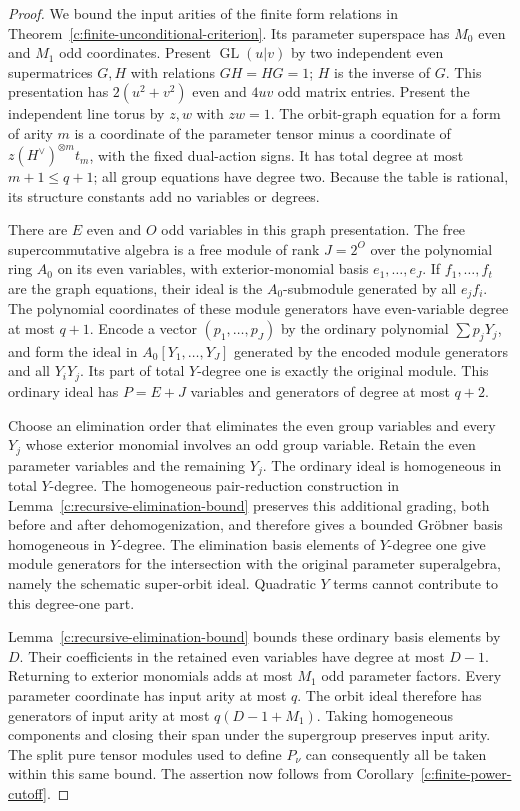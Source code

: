 \begin{proof}
We bound the input arities of the finite form relations in
Theorem~\ref{c:finite-unconditional-criterion}.  Its parameter
superspace has $M_0$ even and $M_1$ odd coordinates.
Present $\operatorname{GL}(u|v)$ by two independent even
supermatrices $G,H$ with relations $GH=HG=1$; $H$ is the inverse
of $G$.  This presentation has $2(u^2+v^2)$ even and $4uv$ odd
matrix entries.  Present the independent line torus by $z,w$
with $zw=1$.  The orbit-graph equation for a form of arity $m$
is a coordinate of the parameter tensor minus a coordinate of
$z(H^\vee)^{\otimes m}t_m$, with the fixed dual-action signs.
It has total degree at most $m+1\leq q+1$; all group equations
have degree two.  Because the table is rational, its structure
constants add no variables or degrees.

There are $E$ even and $O$ odd variables in this graph
presentation.  The free supercommutative algebra is a free module
of rank $J=2^O$ over the polynomial ring $A_0$ on its even
variables, with exterior-monomial basis $e_1,\ldots,e_J$.
If $f_1,\ldots,f_t$ are the graph equations, their ideal is the
$A_0$-submodule generated by all $e_j f_i$.  The polynomial
coordinates of these module generators have even-variable
degree at most $q+1$.  Encode a vector $(p_1,\ldots,p_J)$ by
the ordinary polynomial $\sum p_jY_j$, and form the ideal in
$A_0[Y_1,\ldots,Y_J]$ generated by the encoded module generators
and all $Y_iY_j$.  Its part of total $Y$-degree one is exactly
the original module.  This ordinary ideal has $P=E+J$ variables
and generators of degree at most $q+2$.

Choose an elimination order that eliminates the even group
variables and every $Y_j$ whose exterior monomial involves an
odd group variable.  Retain the even parameter variables and
the remaining $Y_j$.  The ordinary ideal is homogeneous in
total $Y$-degree.  The homogeneous pair-reduction construction in
Lemma~\ref{c:recursive-elimination-bound} preserves this additional
grading, both before and after dehomogenization, and therefore
gives a bounded Gr\"obner basis homogeneous in $Y$-degree.  The elimination basis elements of
$Y$-degree one give module generators for the intersection with
the original parameter superalgebra, namely the schematic
super-orbit ideal.  Quadratic $Y$ terms cannot contribute to
this degree-one part.

Lemma~\ref{c:recursive-elimination-bound} bounds these ordinary
basis elements by $D$.  Their coefficients in the retained even
variables have degree at most $D-1$.  Returning to exterior
monomials adds at most $M_1$ odd parameter factors.  Every
parameter coordinate has input arity at most $q$.  The orbit
ideal therefore has generators of input arity at most
$q(D-1+M_1)$.  Taking homogeneous components and closing their
span under the supergroup preserves input arity.  The split
pure tensor modules used to define $P_\nu$ can consequently
all be taken within this same bound.  The assertion now follows
from Corollary~\ref{c:finite-power-cutoff}.
\end{proof}


